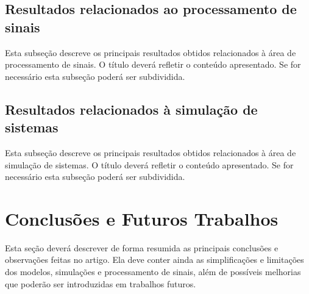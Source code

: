 \subsection{Resultados relacionados ao processamento de sinais}

Esta subseção descreve os principais resultados obtidos relacionados à área de processamento de sinais.
O título deverá refletir o conteúdo apresentado. Se for necessário esta subseção poderá ser subdividida.

\subsection{Resultados relacionados à simulação de sistemas}

Esta subseção descreve os principais resultados obtidos relacionados à área de simulação de sistemas.
O título deverá refletir o conteúdo apresentado.
Se for necessário esta subseção poderá ser subdividida.

\section{Conclusões e Futuros Trabalhos}

Esta seção deverá descrever de forma resumida as principais conclusões e observações feitas no artigo.
Ela deve conter ainda as simplificações e limitações dos modelos, simulações e processamento de sinais, além de possíveis melhorias que poderão ser introduzidas em trabalhos futuros.
